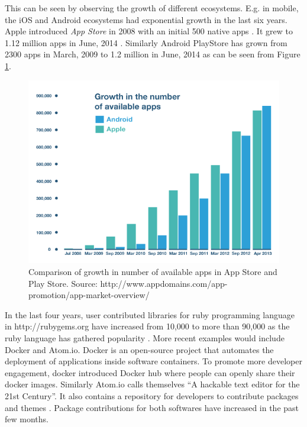 This can be seen by observing the growth of different ecosystems. E.g. in mobile, the iOS and Android ecosystems had exponential growth in the last six years. Apple introduced \textit{App Store} in 2008 with an initial 500 native apps \cite{applefivehundrednatievapps}. It grew to 1.12 million apps in June, 2014 \cite{appstoretwelvemillionapps}. Similarly Android PlayStore has grown from 2300 apps in March, 2009 to 1.2 million in June, 2014 \cite{wpandroidhistory} as can be seen from Figure \ref{fig:app-bar-chart-3}.

\begin{figure}
  \centering
  \includegraphics[width=13cm]{figures/app-bar-chart-3.png}
  \caption{Comparison of growth in number of available apps in App Store and Play Store. Source: http://www.appdomains.com/app-promotion/app-market-overview/}
  \label{fig:app-bar-chart-3}
\end{figure}

In the last four years, user contributed libraries for ruby programming language in http://rubygems.org have increased from 10,000 to more than 90,000 as the ruby language has gathered popularity \cite{modulecounts}. More recent examples would include Docker and Atom.io. Docker is an open-source project that automates the deployment of applications inside software containers. To promote more developer engagement, docker introduced Docker hub \cite{dockerhub}\cite{wiki:Docker_Software} where people can openly share their docker images. Similarly Atom.io calls themselves ``A hackable text editor for the 21st Century''. It also contains a repository for developers to contribute packages and themes \cite{atomiorepo}\cite{wiki:Atom_TextEditor}. Package contributions for both softwares have increased in the past few months.

